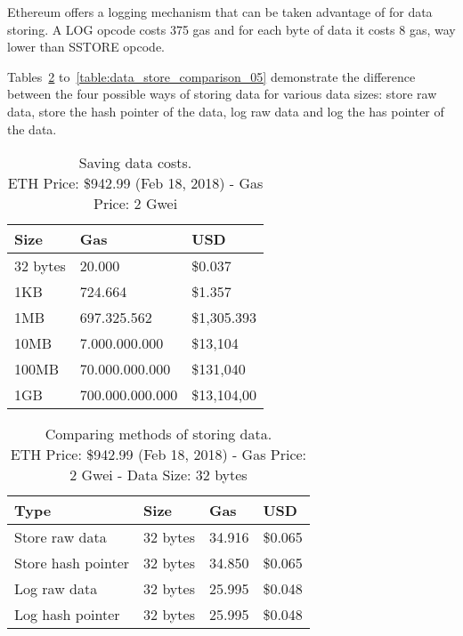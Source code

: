 Ethereum offers a logging mechanism that can be taken advantage of for data storing. A LOG opcode costs 375 gas and for each byte of data it costs 8 gas, way lower than SSTORE opcode.

Tables~\ref{table:data_store_comparison_01} to~\ref{table:data_store_comparison_05} demonstrate the difference between the four possible ways of storing data for various data sizes: store raw data, store the hash pointer of the data, log raw data and log the has pointer of the data.

\begin{table}[!ht]
\centering
\begin{tabular}{|l|l|l|}
\hline
 Size & Gas  & USD \\ \hline
 32 bytes & 20.000  & \$0.037 \\ \hline
 1KB & 724.664  & \$1.357 \\ \hline
 1MB & 697.325.562  & \$1,305.393 \\ \hline
 10MB & 7.000.000.000  & \$13,104 \\ \hline
 100MB & 70.000.000.000  & \$131,040 \\ \hline
 1GB & 700.000.000.000  & \$13,104,00 \\ \hline
\end{tabular}
\captionsetup{format=hang, justification=centering}
\caption{Saving data costs.\\ ETH Price: \$942.99 (Feb 18, 2018) - Gas Price: 2 Gwei}
\label{table:bytes_usd_cost}
\end{table}

\begin{table}[!ht]
  \centering
  \begin{tabular}{|l|l|l|l|}
  \hline
  Type & Size & Gas  & USD \\ \hline
  Store raw data & 32 bytes & 34.916  & \$0.065 \\ \hline
  Store hash pointer & 32 bytes & 34.850  & \$0.065 \\ \hline
  Log raw data & 32 bytes & 25.995  & \$0.048 \\ \hline
  Log hash pointer & 32 bytes & 25.995  & \$0.048 \\ \hline
  \end{tabular}
  \captionsetup{format=hang, justification=centering}
  \caption{Comparing methods of storing data.\\ ETH Price: \$942.99 (Feb 18, 2018) - Gas Price: 2 Gwei - Data Size: 32 bytes}
  \label{table:data_store_comparison_01}
\end{table}

